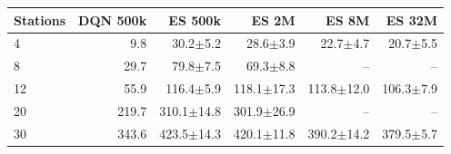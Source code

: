 \begin{tabular}{lrrrrr}
\toprule
Stations & DQN 500k & ES 500k & ES 2M & ES 8M & ES 32M \\
\midrule
4 & 9.8 & 30.2$\pm$5.2 & 28.6$\pm$3.9 & 22.7$\pm$4.7 & 20.7$\pm$5.5 \\
8 & 29.7 & 79.8$\pm$7.5 & 69.3$\pm$8.8 & -- & -- \\
12 & 55.9 & 116.4$\pm$5.9 & 118.1$\pm$17.3 & 113.8$\pm$12.0 & 106.3$\pm$7.9 \\
20 & 219.7 & 310.1$\pm$14.8 & 301.9$\pm$26.9 & -- & -- \\
30 & 343.6 & 423.5$\pm$14.3 & 420.1$\pm$11.8 & 390.2$\pm$14.2 & 379.5$\pm$5.7 \\
\bottomrule
\end{tabular}
